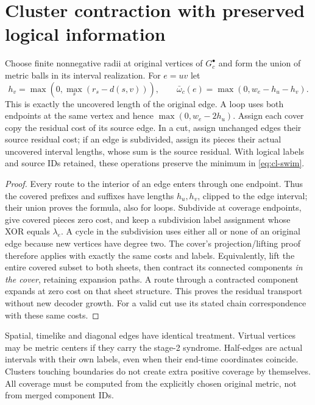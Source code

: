 \section{Cluster contraction with preserved logical information}
\label{sec:cl-clusters}
\begin{theorem}\label{thm:cl-transport}
Choose finite nonnegative radii at original vertices of $G_c^\bullet$
and form the union of metric balls in its interval realization.
For $e=uv$ let
\[
 h_v=\max(0,\max_s(r_s-d(s,v))),\qquad
 \bar\omega_c(e)=\max(0,w_e-h_u-h_v).
\]
This is exactly the uncovered length of the original edge. A loop uses
both endpoints at the same vertex and hence $\max(0,w_e-2h_u)$.
Assign each cover copy the residual cost of its source edge. In a cut,
assign unchanged edges their source residual cost; if an edge is subdivided,
assign its pieces their actual uncovered interval lengths, whose sum is
the source residual. With logical labels and source IDs retained, these
operations preserve the minimum in \eqref{eq:cl-swim}.
\end{theorem}
\begin{proof}
Every route to the interior of an edge enters through one endpoint.
Thus the covered prefixes and suffixes have lengths $h_u,h_v$, clipped
to the edge interval; their union proves the formula, also for loops.
Subdivide at coverage endpoints, give covered pieces zero cost, and keep
a subdivision label assignment whose XOR equals $\lambda_e$.
A cycle in the subdivision uses either all or none of an original edge
because new vertices have degree two. The cover's projection/lifting
proof therefore applies with exactly the same costs and labels.
Equivalently, lift the entire covered subset to both sheets, then contract
its connected components \emph{in the cover}, retaining expansion paths.
A route through a contracted component expands at zero cost on that sheet
structure. This proves the residual transport without new decoder growth.
For a valid cut use its stated chain correspondence with these same costs.
\end{proof}
Spatial, timelike and diagonal edges have identical treatment. Virtual
vertices may be metric centers if they carry the stage-2 syndrome.
Half-edges are actual intervals with their own labels, even when their
end-time coordinates coincide. Clusters touching boundaries do not create
extra positive coverage by themselves. All coverage must be computed
from the explicitly chosen original metric, not from merged component IDs.

